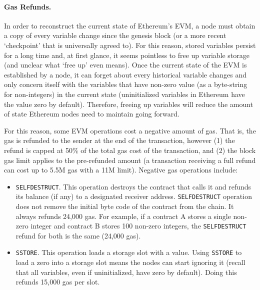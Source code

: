 

\paragraph{Gas Refunds.} In order to reconstruct the current state of Ethereum's EVM, a node must obtain a copy of every variable change since the genesis block (or a more recent `checkpoint' that is universally agreed to). For this reason, stored variables persist for a long time and, at first glance, it seems pointless to free up variable storage (and unclear what `free up' even means). Once the current state of the EVM is established by a node, it can forget about every historical variable changes and only concern itself with the variables that have non-zero value (as a byte-string for non-integers) in the current state (uninitialized variables in Ethereum have the value zero by default). Therefore, freeing up variables will reduce the amount of state Ethereum nodes need to maintain going forward.

For this reason, some EVM operations cost a negative amount of gas. That is, the gas is refunded to the sender at the end of the transaction, however (1) the refund is capped at 50\% of the total gas cost of the transaction, and (2) the block gas limit applies to the pre-refunded amount (\ie a transaction receiving a full refund can cost up to 5.5M gas with a 11M limit). Negative gas operations include:

\begin{itemize}

\item \texttt{SELFDESTRUCT}. This operation destroys the contract that calls it and refunds its balance (if any) to a designated receiver address. \texttt{SELFDESTRUCT} operation does not remove the initial byte code of the contract from the chain. It always refunds 24,000 gas. For example, if a contract A stores a single non-zero integer and contract B stores 100 non-zero integers, the \texttt{SELFDESTRUCT} refund for both is the same (24,000 gas).


\item \texttt{SSTORE}. This operation loads a storage slot with a value. Using \texttt{SSTORE} to load a zero into a storage slot means the nodes can start ignoring it (recall that all variables, even if uninitialized, have zero by default). Doing this refunds 15,000 gas per slot. 

\end{itemize} 

